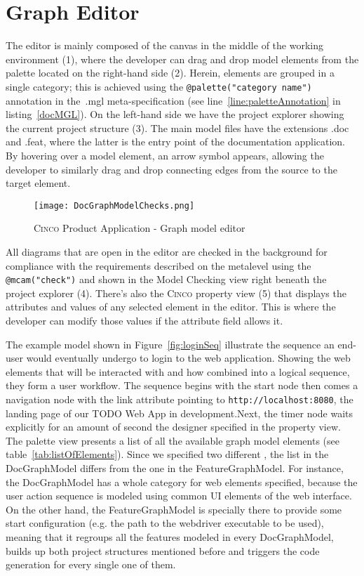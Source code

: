\section{Graph Editor}\label{sec:graphEditor}

The editor is mainly composed of the canvas in the middle of the working environment (1), where the developer can drag and drop model elements from the palette located on the right-hand side (2). Herein, elements are grouped in a single category; this is achieved using the \lstinline[language=MGL]{@palette("category name")} annotation in the~.mgl meta-specification (see line~\ref{line:paletteAnnotation} in listing~\ref{docMGL}). On the left-hand side we have the project explorer showing the current project structure (3). The main model files have the extensions .doc and .feat, where the latter is the entry point of the documentation application. By hovering over a model element, an arrow symbol appears, allowing the developer to similarly drag and drop connecting edges from the source to the target element.

\begin{figure}[h]
    \centering
    \texttt{[image: DocGraphModelChecks.png]}
    \caption{\textsc{Cinco} Product Application - Graph model editor}\label{fig:graphDSL}
\end{figure}

All diagrams that are open in the editor are checked in the background for compliance with the requirements described on the metalevel using the \lstinline[language=MGL]{@mcam("check")} and shown in the Model Checking view right beneath the project explorer (4). There's also the \textsc{Cinco} property view (5) that displays the attributes and values of any selected element in the editor. This is where the developer can modify those values if the attribute field allows it.

The example model shown in Figure~\ref{fig:loginSeq} illustrate the sequence an end-user would eventually undergo to login to the web application. Showing the web elements that will be interacted with and how combined into a logical sequence, they form a user workflow. The sequence begins with the start node then comes a navigation node with the link attribute pointing to \lstinline{http://localhost:8080}, the landing page of our TODO Web App in development.Next, the timer node waits explicitly for an amount of second the designer specified in the property view. The palette view presents a list of all the available graph model elements (see table~\ref{tab:listOfElements}). Since we specified two different , the list in the DocGraphModel differs from the one in the FeatureGraphModel. For instance, the DocGraphModel has a whole category for web elements specified, because the user action sequence is modeled using common UI elements of the web interface. On the other hand, the FeatureGraphModel is specially there to provide some start configuration (e.g. the path to the webdriver executable to be used), meaning that it regroups all the features modeled in every DocGraphModel, builds up both project structures mentioned before and triggers the code generation for every single one of them.

